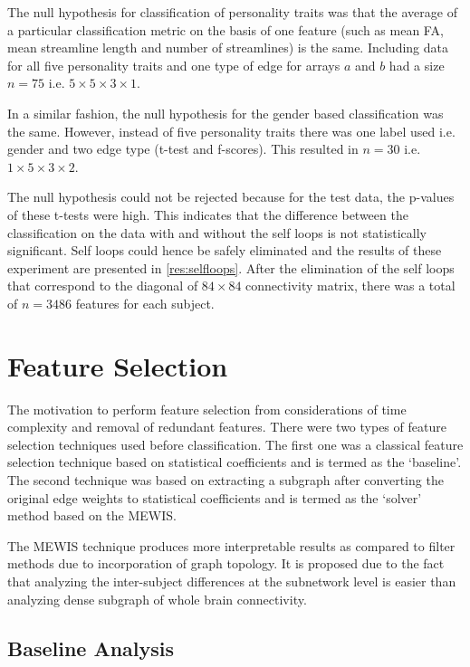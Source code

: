 \documentclass[msthesis.tex]{subfiles}
\begin{document}
The null hypothesis for classification of personality traits was that the average of a particular classification metric on the basis of one feature (such as mean \gls{FA}, mean streamline length and number of streamlines) is the same. Including data for all five personality traits and one type of edge for arrays $a$ and $b$ had a size  $n=75$ i.e. $5\times 5 \times 3 \times 1$. 

In a similar fashion, the null hypothesis for the gender based classification was the same. However, instead of five personality traits there was one label used i.e. gender and two edge type (t-test and f-scores). This resulted in $n=30$ i.e. $1 \times 5 \times 3 \times 2$.

The null hypothesis could not be rejected because for the test data, the p-values of these t-tests were high. This indicates that the difference between the classification on the data with and without the self loops is not statistically significant. Self loops could hence be safely eliminated and the results of these experiment are presented in \autoref{res:selfloops}. After the elimination of the self loops that correspond to the diagonal of $84 \times 84$ connectivity matrix, there was a total of $n = 3486$ features for each subject.

\section{Feature Selection} 
The motivation to perform feature selection from considerations of time complexity and removal of redundant features. There were two types of feature selection techniques used before classification. The first one was a classical feature selection technique based on statistical coefficients and is termed as the `baseline'. The second technique was based on extracting a subgraph after converting the original edge weights to statistical coefficients and is termed as the `solver' method based on the \gls{MEWIS}. 

The \gls{MEWIS} technique produces more interpretable results as compared to filter methods due to incorporation of graph topology. It is proposed due to the fact that analyzing the inter-subject differences at the subnetwork level is easier than analyzing dense subgraph of whole brain connectivity. 

\subsection{Baseline Analysis}
\label{subsec:Baseline_ana}
\end{document}
